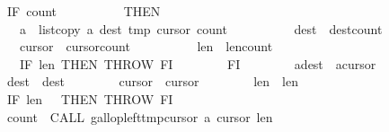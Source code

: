 \begin{isabellebody}
\ \ \ \ \ \ \ \ IF\ {\isasymacute}count{}\ {\isasymnoteq}\ {}\isanewline
\ \ \ \ \ \ \ \ THEN\isanewline
\ \ \ \ \ \ \ \ \ \ {\isasymacute}a\ {\isacharcolon}{\isacharequal}{\isacharequal}\ list{\isacharunderscore}copy\ {\isasymacute}a\ {\isasymacute}dest\ {\isasymacute}tmp\ {\isasymacute}cursor{}\ {\isasymacute}count{}{\isacharsemicolon}{\isacharsemicolon}\isanewline
\ \ \ \ \ \ \ \ \ \ {\isasymacute}dest\ {\isacharcolon}{\isacharequal}{\isacharequal}\ {\isasymacute}dest{\isacharplus}{\isasymacute}count{}{\isacharsemicolon}{\isacharsemicolon}\isanewline
\ \ \ \ \ \ \ \ \ \ {\isasymacute}cursor{}\ {\isacharcolon}{\isacharequal}{\isacharequal}\ {\isasymacute}cursor{}{\isacharplus}{\isasymacute}count{}{\isacharsemicolon}{\isacharsemicolon}\isanewline
\ \ \ \ \ \ \ \ \ \ {\isasymacute}len{}\ {\isacharcolon}{\isacharequal}{\isacharequal}\ {\isasymacute}len{}{\isacharminus}{\isasymacute}count{}{\isacharsemicolon}{\isacharsemicolon}\isanewline
\ \ \ \ \ \ \ \ \ \ IF\ {\isasymacute}len{}{\isasymle}{}\ THEN\ THROW\ FI\isanewline
\ \ \ \ \ \ \ \ FI{\isacharsemicolon}{\isacharsemicolon}\isanewline
\ \ \ \ \ \ \ \ {\isasymacute}a{\isacharbang}{\isasymacute}dest\ {\isacharcolon}{\isacharequal}{\isacharequal}\ {\isasymacute}a{\isacharbang}{\isasymacute}cursor{}{\isacharsemicolon}{\isacharsemicolon}\isanewline
\ \ \ \ \ \ \ \ {\isasymacute}dest\ {\isacharcolon}{\isacharequal}{\isacharequal}\ {\isasymacute}dest{\isacharplus}{}{\isacharsemicolon}{\isacharsemicolon}\isanewline
\ \ \ \ \ \ \ \ {\isasymacute}cursor{}\ {\isacharcolon}{\isacharequal}{\isacharequal}\ {\isasymacute}cursor{}{\isacharplus}{}{\isacharsemicolon}{\isacharsemicolon}\isanewline
\ \ \ \ \ \ \ \ {\isasymacute}len{}\ {\isacharcolon}{\isacharequal}{\isacharequal}\ {\isasymacute}len{}{\isacharminus}{}{\isacharsemicolon}{\isacharsemicolon}\isanewline
\ \ \ \ \ \ \ \ IF\ {\isasymacute}len{}\ {\isacharequal}\ {}\ THEN\ THROW\ FI{\isacharsemicolon}{\isacharsemicolon}\isanewline
\isanewline
\ \ \ \ \ \ \ \ {\isasymacute}count{}\ {\isacharcolon}{\isacharequal}{\isacharequal}\ CALL\ gallop{\isacharunderscore}left{\isacharparenleft}{\isasymacute}tmp{\isacharbang}{\isasymacute}cursor{}{\isacharcomma}\ {\isasymacute}a{\isacharcomma}\ {\isasymacute}cursor{}{\isacharcomma}\ {\isasymacute}len{}{\isacharcomma}\ {}{\isacharparenright}{\isacharsemicolon}{\isacharsemicolon}\isanewline

\end{isabellebody}
